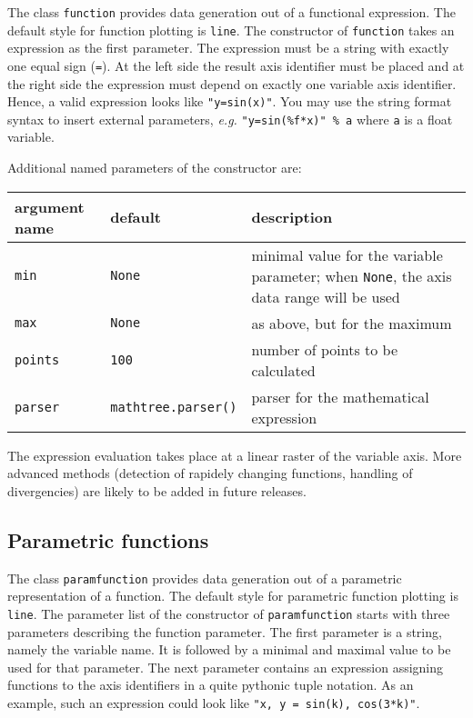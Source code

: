 The class \verb|function| provides data generation out of a functional
expression. The default style for function plotting is \verb|line|.
The constructor of \verb|function| takes an expression as the first
parameter. The expression must be a string with exactly one equal sign
(\verb|=|). At the left side the result axis identifier must be placed
and at the right side the expression must depend on exactly one
variable axis identifier. Hence, a valid expression looks like
\verb|"y=sin(x)"|. You may use the string format syntax to insert
external parameters, \textit{e.g.} \verb|"y=sin(%f*x)" % a| where
\verb|a| is a float variable.

Additional named parameters of the constructor are:

\medskip
\begin{tabularx}{\linewidth}{ll>{\raggedright\arraybackslash}X}
argument name&default&description\\
\hline
\texttt{min}&\texttt{None}&minimal value for the variable parameter; when \texttt{None}, the axis data range will be used\\
\texttt{max}&\texttt{None}&as above, but for the maximum\\
\texttt{points}&\texttt{100}&number of points to be calculated\\
\texttt{parser}&\texttt{mathtree.parser()}&parser for the mathematical expression\\
\end{tabularx}
\medskip

The expression evaluation takes place at a linear raster of the
variable axis. More advanced methods (detection of rapidely changing
functions, handling of divergencies) are likely to be added in future
releases.

\subsection{Parametric functions}

The class \verb|paramfunction| provides data generation out of a
parametric representation of a function. The default style for
parametric function plotting is \verb|line|. The parameter list of the
constructor of \verb|paramfunction| starts with three parameters
describing the function parameter. The first parameter is a string,
namely the variable name. It is followed by a minimal and maximal
value to be used for that parameter. The next parameter contains an
expression assigning functions to the axis identifiers in a quite
pythonic tuple notation. As an example, such an expression could look
like \verb|"x, y = sin(k), cos(3*k)"|.

